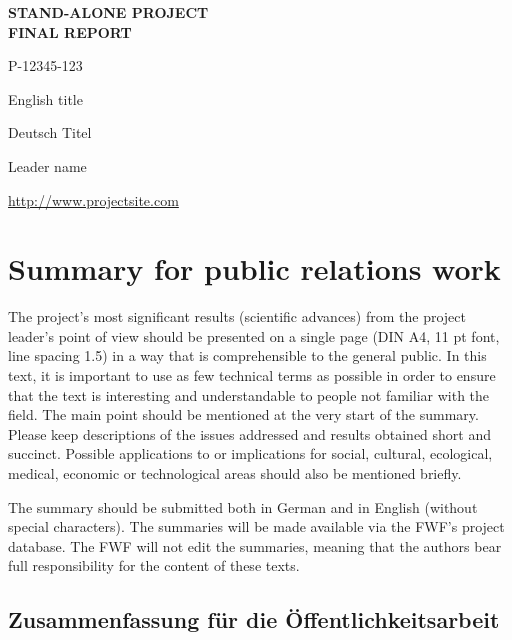 \documentclass[a4paper, 11pt]{article}
\begin{document}
\begin{center}
\fontsize{16pt}{19.2pt}\selectfont
  \textbf{STAND-ALONE PROJECT}\\
  \textbf{FINAL REPORT}
\end{center}
\vspace{1cm}

 P-12345-123
\newline

English title

\makebox[3.5cm][l]{}
Deutsch Titel
\newline

 Leader name

\url{http://www.projectsite.com}

\newpage

\section{Summary for public relations work}

The project's most significant results (scientific advances) from the project
leader's point of view should be presented on a single page (DIN A4, 11 pt font,
line spacing 1.5) in a way that is comprehensible to the general public. In this
text, it is important to use as few technical terms as possible in order to
ensure that the text is interesting and understandable to people not familiar
with the field. The main point should be mentioned at the very start of the
summary. Please keep descriptions of the issues addressed and results obtained
short and succinct. Possible applications to or implications for social,
cultural, ecological, medical, economic or technological areas should also be
mentioned briefly.

The summary should be submitted both in German and in English (without special
characters). The summaries will be made available via the FWF's project
database. The  FWF will not edit the summaries, meaning that the authors bear
full responsibility for the content of these texts.

\subsection{Zusammenfassung f\"{u}r die \"{O}ffentlichkeitsarbeit}
\end{document}

